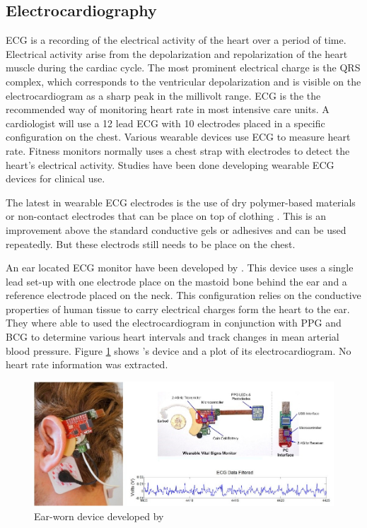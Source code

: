 \subsection{Electrocardiography}
ECG is a recording of the electrical activity of the heart over a period of time. Electrical activity arise from the depolarization and repolarization of the heart muscle during the cardiac cycle. The most prominent electrical charge is the QRS complex, which corresponds to the ventricular depolarization and is visible on the electrocardiogram as a sharp peak in the millivolt range. ECG is the the recommended way of monitoring heart rate in most intensive care units. A cardiologist will use a 12 lead ECG with 10 electrodes placed in a specific configuration on the chest. Various wearable devices use ECG to measure heart rate. Fitness monitors normally uses a chest strap with electrodes to detect the heart's electrical activity. Studies have been done developing wearable ECG devices for clinical use.

\medskip
The latest in wearable ECG electrodes is the use of dry polymer-based materials \citep{wang2010wearable} or non-contact electrodes that can be place on top of clothing \citep{lin2013development}. This is an improvement above the standard conductive gels or adhesives and can be used repeatedly. But these electrods still needs to be place on the chest.

\medskip
An ear located ECG monitor have been developed by \cite{winokur2012wearable}. This device uses a single lead set-up with one electrode place on the mastoid bone behind the ear and a reference electrode placed on the neck. This configuration relies on the conductive properties of human tissue to carry electrical charges form the heart to the ear. They where able to used the electrocardiogram in conjunction with PPG and BCG to determine various heart intervals and track changes in mean arterial blood pressure. Figure \ref{fig:Winokur} shows \cite{winokur2012wearable}'s device and a plot of its electrocardiogram. No heart rate information was extracted.

\medskip

\begin{figure}[H]
   \centering
   \includegraphics[scale=0.5]{figs/Winokur}
   \caption{Ear-worn device developed by \cite{winokur2012wearable}}
   \label{fig:Winokur}
\end{figure}


